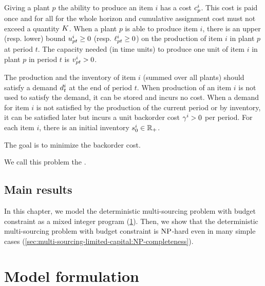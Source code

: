 Giving a plant $p$ the ability to produce an item $i$ has a cost $c_p^i$.
This cost is paid once and for all for the whole horizon and cumulative assignment cost must not exceed a quantity $K$.
When a plant $p$ is able to produce item $i$, there is an upper (resp. lower) bound $u_{pt}^i\ge 0$ (resp. $\ell_{pt}^i\ge 0$) on the production of item $i$ in plant $p$ at period $t$.
The capacity needed (in time units) to produce one unit of item $i$ in plant $p$ in period $t$ is $v_{pt}^i>0$.


The production and the inventory of item $i$ (summed over all plants) should satisfy a demand $d_t^i$ at the end of period $t$.
When production of an item $i$ is not used to satisfy the demand, it can be stored and incurs no cost.
When a demand for item $i$ is not satisfied by the production of the current period or by inventory, it can be satisfied later but incurs a unit backorder cost $\gamma^i>0$ per period.
For each item $i$, there is an initial inventory $s_0^i\in\mathbb{R}_+$.


The goal is to minimize the backorder cost.


We call this problem the \emph{\tbc}.



\subsection{Main results}


In this chapter, we model the deterministic multi-sourcing problem with budget constraint as a mixed integer program (\cref{sec:multi-sourcing-limited-capital:model-formulation}).
Then, we show that the deterministic multi-sourcing problem with budget constraint is $\operatorname{NP}$-hard even in many simple cases (\cref{sec:multi-sourcing-limited-capital:NP-completeness}).






\section{Model formulation}
\label{sec:multi-sourcing-limited-capital:model-formulation}


